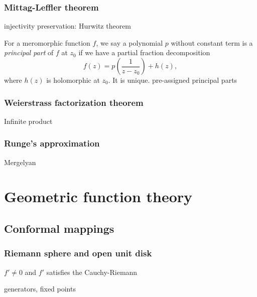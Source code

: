 \documentclass{../../large}
\begin{document}
\section{Mittag-Leffler theorem}
\begin{prb}
\begin{parts}
\item injectivity preservation: Hurwitz theorem
\end{parts}
\end{prb}

\begin{prb}
For a meromorphic function $f$, we say a polynomial $p$ without constant term is a \emph{principal part} of $f$ at $z_0$ if we have a partial fraction decomposition
\[f(z)=p\left(\frac1{z-z_0}\right)+h(z),\]
where $h(z)$ is holomorphic at $z_0$.
It is unique.
pre-assigned principal parts
\end{prb}

\section{Weierstrass factorization theorem}
Infinite product

\section{Runge's approximation}
Mergelyan









\part{Geometric function theory}

\chapter{Conformal mappings}
\section{Riemann sphere and open unit disk}
\begin{prb}
$f'\ne0$ and $f'$ satisfies the Cauchy-Riemann
\end{prb}
\begin{prb}
generators,
fixed points
\end{prb}
\begin{prb}
\end{prb}
\end{document}
